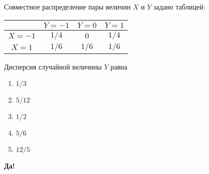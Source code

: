 \documentclass[t]{beamer}
\begin{document}
 \begin{frame} \label{15-Yes} 
\begin{block}{15} 

Совместное распределение пары величин $X$ и $Y$ задано таблицей:

\begin{center}
	\begin{tabular}{@{}c|ccc@{}}
		\toprule
		& $Y=-1$ & $Y=0$ & $Y=1$ \\ \midrule
		$X=-1$ & $1/4$  & $0$   & $1/4$ \\
		$X=1$  & $1/6$  & $1/6$ & $1/6$ \\ \bottomrule
	\end{tabular}
\end{center}

\vspace{0.5cm} 
 
 
Дисперсия случайной величины $Y$  равна
 


 \end{block} 
\begin{enumerate} 
\item[] \hyperlink{15-No}{\beamergotobutton{} $1/3$}
\item[] \hyperlink{15-No}{\beamergotobutton{} $5/12$}
\item[] \hyperlink{15-No}{\beamergotobutton{} $1/2$}
\item[] \hyperlink{15-Yes}{\beamergotobutton{} $5/6$}
\item[] \hyperlink{15-No}{\beamergotobutton{} $12/5$
}
\end{enumerate} 

 \textbf{Да!} 
 \hyperlink{16}{}\end{frame} 
\end{document}
